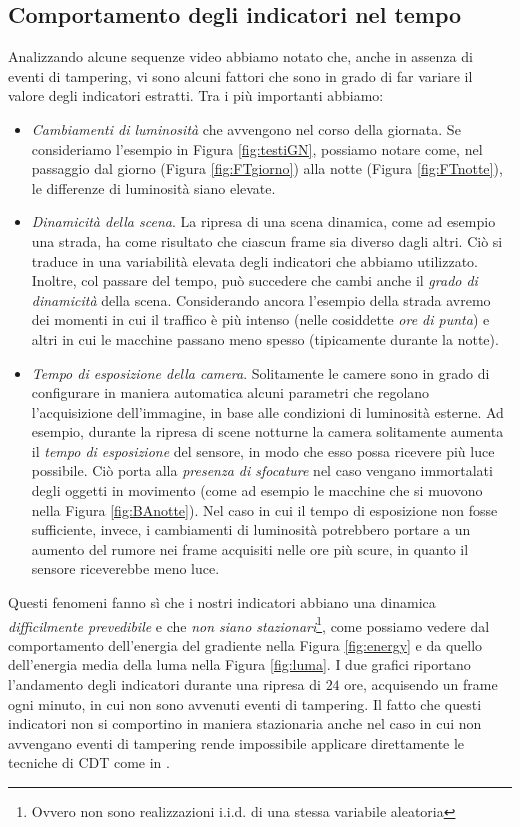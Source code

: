 \subsection{Comportamento degli indicatori nel tempo}
\label{comportamento}
Analizzando alcune sequenze video abbiamo notato che, anche in assenza di eventi di tampering, vi sono alcuni fattori che sono in grado di far variare il valore degli indicatori estratti.
Tra i pi\`u importanti abbiamo:
\begin{itemize}
	\item \textit{Cambiamenti di luminosit\`a} che avvengono nel corso della giornata. 
	Se consideriamo l'esempio in Figura \ref{fig:testiGN}, possiamo notare come, nel passaggio dal giorno (Figura \ref{fig:FTgiorno}) alla notte (Figura \ref{fig:FTnotte}), le differenze di luminosit\`a siano elevate.  
	\item \textit{Dinamicit\`a della scena}. La ripresa di una scena dinamica, come ad esempio una strada, ha come risultato che ciascun frame sia diverso dagli altri.
	Ci\`o si traduce in una variabilit\`a elevata degli indicatori che abbiamo utilizzato. 
	Inoltre, col passare del tempo, pu\`o succedere che cambi anche il \textit{grado di dinamicit\`a} della scena.
	Considerando ancora l'esempio della strada avremo dei momenti in cui il traffico \`e pi\`u intenso (nelle cosiddette \textit{ore di punta}) e altri in cui le macchine passano meno spesso (tipicamente durante la notte).
	\item \textit{Tempo di esposizione della camera}. Solitamente le camere sono in grado di configurare in maniera automatica alcuni parametri che regolano l'acquisizione dell'immagine, in base alle condizioni di luminosit\`a esterne.
	Ad esempio, durante la ripresa di scene notturne la camera solitamente aumenta il \textit{tempo di esposizione} del sensore, in modo che esso possa ricevere pi\`u luce possibile.
	Ci\`o porta alla \textit{presenza di sfocature} nel caso vengano immortalati degli oggetti in movimento (come ad esempio le macchine che si muovono nella Figura \ref{fig:BAnotte}).
	Nel caso in cui il tempo di esposizione non fosse sufficiente, invece, i cambiamenti di luminosit\`a potrebbero portare a un aumento del rumore nei frame acquisiti nelle ore pi\`u scure, in quanto il sensore riceverebbe meno luce.
\end{itemize} 
Questi fenomeni fanno s\`i che i nostri indicatori abbiano una dinamica \textit{difficilmente prevedibile} e che \textit{non siano stazionari}\footnote{Ovvero non sono realizzazioni i.i.d. di una stessa variabile aleatoria}, come possiamo vedere dal comportamento dell'energia del gradiente nella Figura \ref{fig:energy} e da quello dell'energia media della luma nella Figura \ref{fig:luma}.
I due grafici riportano l'andamento degli indicatori durante una ripresa di $24$ ore, acquisendo un frame ogni minuto, in cui non sono avvenuti eventi di tampering.
Il fatto che questi indicatori non si comportino in maniera stazionaria anche nel caso in cui non avvengano eventi di tampering rende impossibile applicare direttamente le tecniche di CDT come in \cite{alippi2010detecting}. \\
